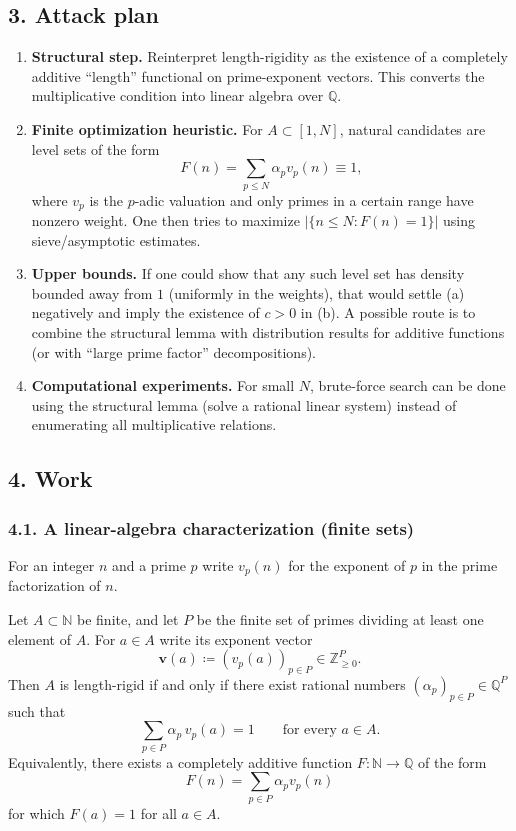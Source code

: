 \subsection*{3. Attack plan}
\begin{enumerate}[leftmargin=2em]
\item \textbf{Structural step.} Reinterpret length-rigidity as the existence of a completely additive ``length'' functional on prime-exponent vectors. This converts the multiplicative condition into linear algebra over $\mathbb{Q}$.
\item \textbf{Finite optimization heuristic.} For $A\subset[1,N]$, natural candidates are level sets of the form
\[
F(n)=\sum_{p\le N} \alpha_p v_p(n)\equiv 1,
\]
where $v_p$ is the $p$-adic valuation and only primes in a certain range have nonzero weight. One then tries to maximize $|\{n\le N: F(n)=1\}|$ using sieve/asymptotic estimates.
\item \textbf{Upper bounds.} If one could show that any such level set has density bounded away from $1$ (uniformly in the weights), that would settle (a) negatively and imply the existence of $c>0$ in (b). A possible route is to combine the structural lemma with distribution results for additive functions (or with ``large prime factor'' decompositions).
\item \textbf{Computational experiments.} For small $N$, brute-force search can be done using the structural lemma (solve a rational linear system) instead of enumerating all multiplicative relations.
\end{enumerate}

\subsection*{4. Work}
\subsubsection*{4.1. A linear-algebra characterization (finite sets)}
For an integer $n$ and a prime $p$ write $v_p(n)$ for the exponent of $p$ in the prime factorization of $n$.

\begin{lemma}
\label{lem:additive-functional}
Let $A\subset\mathbb{N}$ be finite, and let $P$ be the finite set of primes dividing at least one element of $A$. For $a\in A$ write its exponent vector
\[
\mathbf v(a)\coloneqq (v_p(a))_{p\in P}\in \mathbb{Z}_{\ge 0}^{P}.
\]
Then $A$ is length-rigid if and only if there exist rational numbers $(\alpha_p)_{p\in P}\in\mathbb{Q}^{P}$ such that
\begin{equation}
\label{eq:alpha-eq}
\sum_{p\in P} \alpha_p\, v_p(a)=1\qquad\text{for every }a\in A.
\end{equation}
Equivalently, there exists a completely additive function $F:\mathbb{N}\to\mathbb{Q}$ of the form
\[
F(n)=\sum_{p\in P} \alpha_p v_p(n)
\]
for which $F(a)=1$ for all $a\in A$.
\end{lemma}


